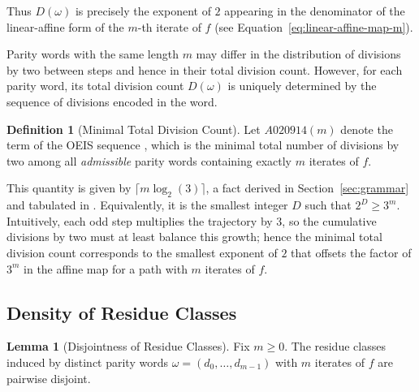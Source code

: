 \documentclass[12pt, oneside]{article}   	%
\numberwithin{equation}{section}          %
\theoremstyle{definition}
\newtheorem{define}{Definition}[section]
\newtheorem{lemma}[theorem]{Lemma}
\begin{document}
Thus $D(\omega)$ is precisely the exponent of $2$ appearing in the
denominator of the linear-affine form of the $m$-th iterate of $f$ (see
Equation~\eqref{eq:linear-affine-map-m}).

Parity words with the same length $m$ may differ in the distribution of
divisions by two between steps and hence in their total division count.
However, for each parity word, its total division count $D(\omega)$ is
uniquely determined by the sequence of divisions encoded in the word.

\begin{define}[Minimal Total Division Count]
Let $A020914(m)$ denote the term of the OEIS sequence , 
which is the minimal total number of divisions by two among all
\emph{admissible} parity words containing exactly $m$ iterates of $f$.
\end{define}

This quantity is given by $\lceil m \log_2(3) \rceil$, a fact derived in
Section~\ref{sec:grammar} and tabulated in .  Equivalently,
it is the smallest integer $D$ such that $2^D \ge 3^m$. Intuitively,
each odd step multiplies the trajectory by $3$, so the cumulative divisions
by two must at least balance this growth; hence the minimal total division
count corresponds to the smallest exponent of $2$ that offsets the factor
of $3^m$ in the affine map for a path with $m$ iterates of $f$.


\subsection{Density of Residue Classes}

\begin{lemma}[Disjointness of Residue Classes]
Fix $m \ge 0$. The residue classes induced by distinct parity words
\(\omega = (d_0,\dots,d_{m-1})\) with $m$ iterates of $f$ are pairwise disjoint.
\end{lemma}
\end{document}
